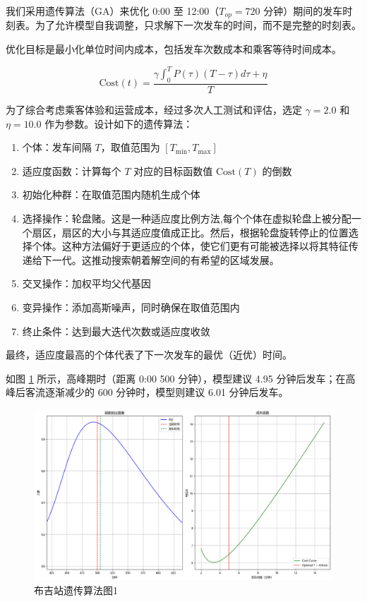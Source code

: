 
我们采用遗传算法（GA）\cite{HollandGA}来优化 0:00 至 12:00（$T_{op}=720$ 分钟）期间的发车时刻表。为了允许模型自我调整，只求解下一次发车的时间，而不是完整的时刻表。\cite{GoldbergGA}

优化目标是最小化单位时间内成本，包括发车次数成本和乘客等待时间成本。

$$
\text{Cost}(t) = \frac{\gamma \int _0 ^T P(\tau)(T-\tau)d\tau + \eta}{T}
$$

为了综合考虑乘客体验和运营成本，经过多次人工测试和评估，选定 $\gamma=2.0$ 和 $\eta=10.0$ 作为参数。设计如下的遗传算法：

\begin{enumerate}
    \item 个体：发车间隔 $T$，取值范围为 $[T_{\min}, T_{\max}]$
    \item 适应度函数：计算每个 $T$ 对应的目标函数值 $\text{Cost}(T)$ 的倒数
    \item 初始化种群：在取值范围内随机生成个体
    \item 选择操作：轮盘赌。这是一种适应度比例方法,每个个体在虚拟轮盘上被分配一个扇区，扇区的大小与其适应度值成正比。然后，根据轮盘旋转停止的位置选择个体。这种方法偏好于更适应的个体，使它们更有可能被选择以将其特征传递给下一代。这推动搜索朝着解空间的有希望的区域发展。
    \item 交叉操作：加权平均父代基因
    \item 变异操作：添加高斯噪声，同时确保在取值范围内
    \item 终止条件：达到最大迭代次数或适应度收敛
\end{enumerate}

最终，适应度最高的个体代表了下一次发车的最优（近优）时间。

如图 \ref{fig:gaBuji1} 所示，高峰期时（距离 0:00 500 分钟），模型建议 4.95 分钟后发车；在高峰后客流逐渐减少的 600 分钟时，模型则建议 6.01 分钟后发车。

\begin{figure}[htbp]
    \centering
    \includegraphics[width=1.0\textwidth]{res/Figure_7.png}
    \caption{布吉站遗传算法图1}
    \label{fig:gaBuji1}
\end{figure}

